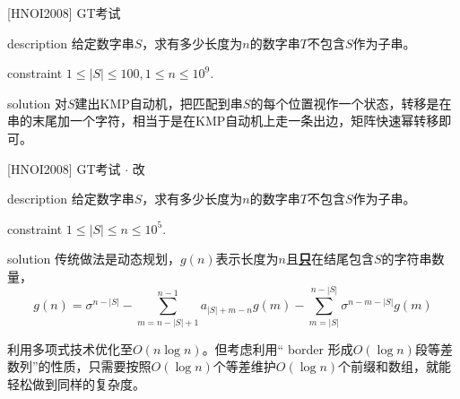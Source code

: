 \documentclass{beamer}
\theoremstyle{compact}
\def\obj#1{\textbf{\uline{#1}}}
\def\le{\leqslant}
\begin{document}
\begin{frame}{[HNOI2008] GT考试}
	\begin{block}{description}
		给定数字串$S$，求有多少长度为$n$的数字串$T$不包含$S$作为子串。
	\end{block}
	\begin{block}{constraint}
		$1 \le |S| \le 100, 1 \le n \le 10^9.$
	\end{block}
	\pause
	\begin{block}{solution}
		对$S$建出KMP自动机，把匹配到串$S$的每个位置视作一个状态，转移是在串的末尾加一个字符，相当于是在KMP自动机上走一条出边，矩阵快速幂转移即可。
	\end{block}
\end{frame}
\begin{frame}{[HNOI2008] GT考试 $\cdot$ 改}
	\begin{block}{description}
		给定数字串$S$，求有多少长度为$n$的数字串$T$不包含$S$作为子串。
	\end{block}
	\begin{block}{constraint}
		$1 \le |S| \le n \le 10^5.$
	\end{block}
	\pause
	\begin{block}{solution}
		传统做法是动态规划，$g(n)$表示长度为$n$且\obj{只}在结尾包含$S$的字符串数量，
		$$g(n) = 
			\sigma^{n-|S|} - \sum\limits_{m=n-|S|+1}^{n-1}a_{|S| + m - n}g(m) - \sum\limits_{m=|S|}^{n-|S|}\sigma^{n-m-|S|}g(m)
		$$

		利用多项式技术优化至$O(n \log n)$。\pause 但考虑利用“ border 形成$O(\log n)$段等差数列”的性质，只需要按照$O(\log n)$个等差维护$O(\log n)$个前缀和数组，就能轻松做到同样的复杂度。
	\end{block}
\end{frame}
\end{document}
